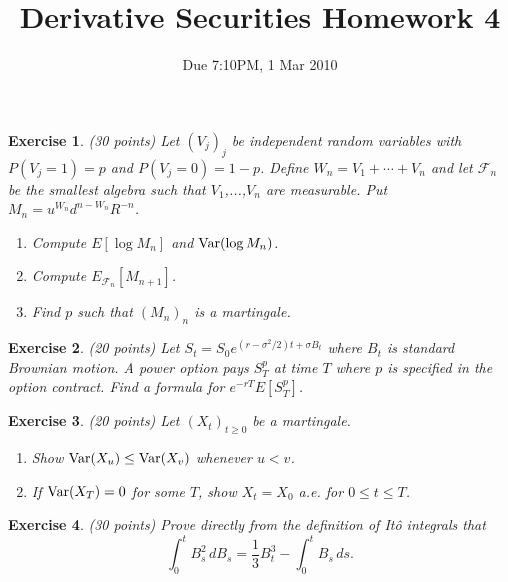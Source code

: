 \documentclass[11pt,fleqn]{amsproc}
\newcommand{\F}{\mathcal{F}}
\newcommand{\Var}{\mathop{\rm{Var}}}
\newtheorem{xca}{Exercise}
\begin{document}
\title{Derivative Securities Homework 4}
\author{Due 7:10PM, 1 Mar 2010}

\maketitle


\begin{xca}{(30 points)}
Let $(V_j)_j$ be independent random variables with $P(V_j = 1) = p$
and $P(V_j = 0) = 1 - p$. Define $W_n = V_1 + \cdots + V_n$ and
let $\F_n$ be the smallest algebra such that $V_1$,...,$V_n$ are
measurable. Put $M_n = u^{W_n}d^{n - W_n} R^{-n}$.
\begin{enumerate}
\item Compute $E[\log M_n]$ and $\Var(\log M_n)$.
\item Compute $E_{\F_n}[M_{n + 1}]$.
\item Find $p$ such that $(M_n)_n$ is a martingale.
\end{enumerate}
\end{xca}

\begin{xca}{(20 points)}
Let $S_t = S_0e^{(r - \sigma^2/2)t + \sigma B_t}$ where $B_t$ is
standard Brownian motion.
A {\rm power option} pays $S_T^p$ at time $T$ where $p$ is specified
in the option contract. Find
a formula for $e^{-rT}E[S_T^p]$.
\end{xca}

\begin{xca}{(20 points)}
Let $(X_t)_{t\ge0}$ be a martingale.
\begin{enumerate}
\item Show $\Var(X_u) \le \Var(X_v)$ whenever $u < v$.
\item If $\Var(X_T) = 0$ for some $T$, show $X_t = X_0$ a.e. for $0\le t\le T$.
\end{enumerate}
\end{xca}

\begin{xca}{(30 points)}
Prove directly from the definition of It\^o integrals that
\begin{equation*}
\int_0^t B_s^2\,dB_s = \frac{1}{3}B_t^3 - \int_0^t B_s\,ds.
\end{equation*}
\end{xca}
\end{document}

